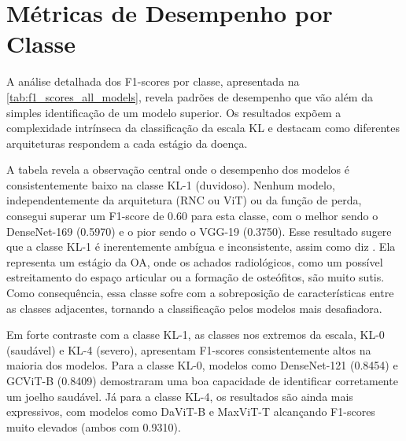 
\section{Métricas de Desempenho por Classe}

A análise detalhada dos F1-scores por classe, apresentada na \autoref{tab:f1_scores_all_models}, revela padrões de desempenho que vão além da simples identificação de um modelo superior. Os resultados expõem a complexidade intrínseca da classificação da escala KL e destacam como diferentes arquiteturas respondem a cada estágio da doença.

A tabela revela a observação central onde o desempenho dos modelos é consistentemente baixo na classe KL-1 (duvidoso). Nenhum modelo, independentemente da arquitetura (RNC ou ViT) ou da função de perda, consegui superar um F1-score de 0.60 para esta classe, com o melhor sendo o DenseNet-169 (0.5970) e o pior sendo o VGG-19 (0.3750). Esse resultado sugere que a classe KL-1 é inerentemente ambígua e inconsistente, assim como diz \cite{Spector1993}. Ela representa um estágio da OA, onde os achados radiológicos, como um possível estreitamento do espaço articular ou a formação de osteófitos, são muito sutis. Como consequência, essa classe sofre com a sobreposição de características entre as classes adjacentes, tornando a classificação pelos modelos mais desafiadora.

Em forte contraste com a classe KL-1, as classes nos extremos da escala, KL-0 (saudável) e KL-4 (severo), apresentam F1-scores consistentemente altos na maioria dos modelos. Para a classe KL-0, modelos como DenseNet-121 (0.8454) e GCViT-B (0.8409) demostraram uma boa capacidade de identificar corretamente um joelho saudável. Já para a classe KL-4, os resultados são ainda mais expressivos, com modelos como DaViT-B e MaxViT-T alcançando F1-scores muito elevados (ambos com 0.9310).

